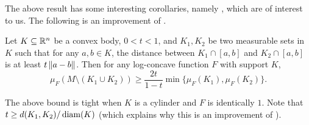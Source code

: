 The above result has some interesting corollaries, namely , which are of interest to us. The following is an improvement of .

\begin{ftheo}
\label{improvement of conductance isoperimetric inequality}
	Let $K\subseteq\mathbb{R}^n$ be a convex body, $0<t<1$, and $K_1,K_2$ be two measurable sets in $K$ such that for any $a,b\in K$, the distance between $K_1\cap[a,b]$ and $K_2\cap[a,b]$ is at least $t\left\lVert a-b\right\rVert$. Then for any log-concave function $F$ with support $K$,
	\[ \mu_F(M\setminus(K_1\cup K_2)) \geq \frac{2t}{1-t} \min\{\mu_F(K_1),\mu_F(K_2)\}. \]
\end{ftheo}

The above bound is tight when $K$ is a cylinder and $F$ is identically $1$. Note that $t \geq d(K_1, K_2)/\operatorname{diam}(K)$ (which explains why this is an improvement of ).

